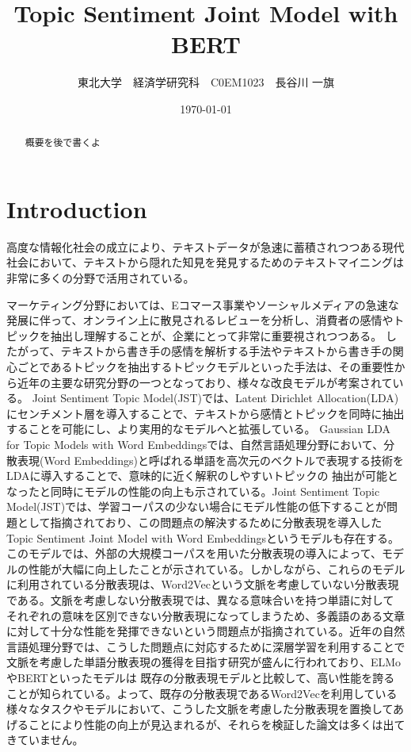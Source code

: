 \documentclass[uplatex]{jsarticle}
\title{Topic Sentiment Joint Model with BERT}
\author{東北大学　経済学研究科　C0EM1023　長谷川 一旗}
\date{\today}
\begin{document}
\maketitle

\begin{abstract}
    \large
    概要を後で書くよ
\end{abstract}
\newpage
\tableofcontents
\twocolumn
\section{Introduction}
高度な情報化社会の成立により、テキストデータが急速に蓄積されつつある現代社会において、テキストから隠れた知見を発見するためのテキストマイニングは非常に多くの分野で活用されている。

マーケティング分野においては、Eコマース事業やソーシャルメディアの急速な発展に伴って、オンライン上に散見されるレビューを分析し、消費者の感情やトピックを抽出し理解することが、企業にとって非常に重要視されつつある。
したがって、テキストから書き手の感情を解析する手法やテキストから書き手の関心ごとであるトピックを抽出するトピックモデルといった手法は、その重要性から近年の主要な研究分野の一つとなっており、様々な改良モデルが考案されている。
Joint Sentiment Topic Model(JST)\cite{JST}では、Latent Dirichlet Allocation(LDA)\cite{LDA}にセンチメント層を導入することで、テキストから感情とトピックを同時に抽出することを可能にし、より実用的なモデルへと拡張している。
Gaussian LDA for Topic Models with Word Embeddings\cite{Gaussian LDA}では、自然言語処理分野において、分散表現(Word Embeddings)と呼ばれる単語を高次元のベクトルで表現する技術をLDAに導入することで、意味的に近く解釈のしやすいトピックの
抽出が可能となったと同時にモデルの性能の向上も示されている。Joint Sentiment Topic Model(JST)では、学習コーパスの少ない場合にモデル性能の低下することが問題として指摘されており、この問題点の解決するために分散表現を導入したTopic Sentiment Joint Model with Word Embeddings\cite{TSWE}というモデルも存在する。
このモデルでは、外部の大規模コーパスを用いた分散表現の導入によって、モデルの性能が大幅に向上したことが示されている。しかしながら、これらのモデルに利用されている分散表現は、Word2Vec\cite{Word2Vec}という文脈を考慮していない分散表現である。文脈を考慮しない分散表現では、異なる意味合いを持つ単語に対して
それぞれの意味を区別できない分散表現になってしまうため、多義語のある文章に対して十分な性能を発揮できないという問題点が指摘されている。近年の自然言語処理分野では、こうした問題点に対応するために深層学習を利用することで文脈を考慮した単語分散表現の獲得を目指す研究が盛んに行われており、ELMo\cite{ELMo}やBERT\cite{BERT}といったモデルは
既存の分散表現モデルと比較して、高い性能を誇ることが知られている。よって、既存の分散表現であるWord2Vecを利用している様々なタスクやモデルにおいて、こうした文脈を考慮した分散表現を置換してあげることにより性能の向上が見込まれるが、それらを検証した論文は多くは出てきていません。
\end{document}
